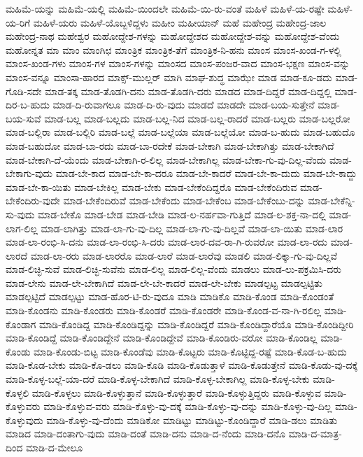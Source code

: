 ಮಹಿಮೆ-ಯನ್ನು
ಮಹಿಮೆ-ಯಲ್ಲಿ
ಮಹಿಮೆ-ಯಿಂದಲೇ
ಮಹಿಮೆ-ಯಿ-ರು-ವಂತೆ
ಮಹಿಳೆ
ಮಹಿಳೆ-ಯ-ರಷ್ಟೇ
ಮಹಿಳೆ-ಯ-ರಿಗೆ
ಮಹಿಳೆ-ಯರು
ಮಹಿಳೆ-ಯೊಬ್ಬಳಿದ್ದಳು
ಮಹೀಂ
ಮಹೀಯಾನ್
ಮಹೆ
ಮಹೇಂದ್ರ
ಮಹೇಂದ್ರ-ಜಾಲ
ಮಹೇಂದ್ರ-ನಾಥ
ಮಹೇಶ್ವರ
ಮಹೋದ್ದೇಶ-ಗಳನ್ನು
ಮಹೋದ್ದೇಶದ
ಮಹೋದ್ದೇಶ-ವನ್ನು
ಮಹೋದ್ದೇಶ-ವೆಂದು
ಮಹೋನ್ನತ
ಮಾ
ಮಾಂ
ಮಾಂಗಿಛ
ಮಾಂತ್ರಿಕ
ಮಾಂತ್ರಿಕ-ತೆಗೆ
ಮಾಂತ್ರಿಕ-ನಿ-ಹನು
ಮಾಂಸ
ಮಾಂಸ-ಖಂಡ-ಗ-ಳಲ್ಲಿ
ಮಾಂಸ-ಖಂಡ-ಗಳು
ಮಾಂಸ-ಗಳ
ಮಾಂಸ-ಗಳನ್ನು
ಮಾಂಸದ
ಮಾಂಸ-ಪಂಜರ-ವಾದ
ಮಾಂಸ-ಭಕ್ಷಣ
ಮಾಂಸ-ವನ್ನು
ಮಾಂಸ-ವನ್ನೂ
ಮಾಂಸಾ-ಹಾರದ
ಮಾಕ್ಸ್‌-ಮುಲ್ಲರ್
ಮಾಗಿ
ಮಾಘ-ಶುದ್ಧ
ಮಾಝೇ
ಮಾಡ
ಮಾಡ-ಕೂ-ಡದು
ಮಾಡ-ಗೊಡಿ-ಸದೇ
ಮಾಡ-ತಕ್ಕ
ಮಾಡ-ತೊಡಗಿ-ದನು
ಮಾಡ-ತೊಡಗಿ-ದರು
ಮಾಡದ
ಮಾಡ-ದಿದ್ದರೆ
ಮಾಡ-ದಿದ್ದಲ್ಲಿ
ಮಾಡ-ದಿರ-ಬ-ಹುದು
ಮಾಡ-ದಿ-ರುವಾಗಲೂ
ಮಾಡ-ದಿ-ರು-ವುದು
ಮಾಡದೆ
ಮಾಡದೇ
ಮಾಡ-ಬಯ-ಸುತ್ತೇನೆ
ಮಾಡ-ಬಯ-ಸುವೆ
ಮಾಡ-ಬಲ್ಲ
ಮಾಡ-ಬಲ್ಲದು
ಮಾಡ-ಬಲ್ಲ-ನಿದ
ಮಾಡ-ಬಲ್ಲ-ರಾದರೆ
ಮಾಡ-ಬಲ್ಲರು
ಮಾಡ-ಬಲ್ಲರೋ
ಮಾಡ-ಬಲ್ಲಿರಾ
ಮಾಡ-ಬಲ್ಲಿರಿ
ಮಾಡ-ಬಲ್ಲೆ
ಮಾಡ-ಬಲ್ಲೆಯಾ
ಮಾಡ-ಬಲ್ಲೆಯೋ
ಮಾಡ-ಬ-ಹುದು
ಮಾಡ-ಬಹುದೊ
ಮಾಡ-ಬಹುದೋ
ಮಾಡ-ಬಾ-ರದು
ಮಾಡ-ಬಾ-ರದೇಕೆ
ಮಾಡ-ಬೇಕಾಗಿ
ಮಾಡ-ಬೇಕಾಗಿತ್ತು
ಮಾಡ-ಬೇಕಾಗಿದೆ
ಮಾಡ-ಬೇಕಾಗಿ-ದೆ-ಯೆಂದು
ಮಾಡ-ಬೇಕಾಗಿ-ರ-ಲಿಲ್ಲ
ಮಾಡ-ಬೇಕಾಗಿಲ್ಲ
ಮಾಡ-ಬೇಕಾ-ಗು-ವು-ದಿಲ್ಲ-ವೆಂದು
ಮಾಡ-ಬೇಕಾಗು-ವುದು
ಮಾಡ-ಬೇ-ಕಾದ
ಮಾಡ-ಬೇ-ಕಾ-ದರೂ
ಮಾಡ-ಬೇ-ಕಾದರೆ
ಮಾಡ-ಬೇ-ಕಾ-ದುದು
ಮಾಡ-ಬೇ-ಕಾದ್ದು
ಮಾಡ-ಬೇ-ಕಾ-ಯಿತು
ಮಾಡ-ಬೇಕಿಲ್ಲ
ಮಾಡ-ಬೇಕು
ಮಾಡ-ಬೇಕೆಂದಿದ್ದರೊ
ಮಾಡ-ಬೇಕೆಂದಿರುವ
ಮಾಡ-ಬೇಕೆಂದಿರು-ವುದೇ
ಮಾಡ-ಬೇಕೆಂದಿರುವೆ
ಮಾಡ-ಬೇಕೆಂದು
ಮಾಡ-ಬೇಕೆಂಬ
ಮಾಡ-ಬೇಕೆಂಬು-ದನ್ನು
ಮಾಡ-ಬೇಕೆನ್ನಿ-ಸು-ವುದು
ಮಾಡ-ಬೇಕೊ
ಮಾಡ-ಬೇಡ
ಮಾಡ-ಬೇಡಿ
ಮಾಡ-ಲ-ನರ್ಹವಾ-ಗುತ್ತಿದೆ
ಮಾಡ-ಲ-ಶಕ್ತ-ನಾ-ದಲ್ಲಿ
ಮಾಡ-ಲಾಗ-ಲಿಲ್ಲ
ಮಾಡ-ಲಾಗಿತ್ತು
ಮಾಡ-ಲಾ-ಗು-ವು-ದಿಲ್ಲ
ಮಾಡ-ಲಾ-ಗು-ವು-ದಿಲ್ಲವೆ
ಮಾಡ-ಲಾ-ಯಿತು
ಮಾಡ-ಲಾರ
ಮಾಡ-ಲಾ-ರಂಭಿ-ಸಿ-ದನು
ಮಾಡ-ಲಾ-ರಂಭಿ-ಸಿ-ದರು
ಮಾಡ-ಲಾರ-ದವ-ರಾ-ಗಿ-ರುವರೋ
ಮಾಡ-ಲಾ-ರದು
ಮಾಡ-ಲಾರದೆ
ಮಾಡ-ಲಾ-ರರು
ಮಾಡ-ಲಾರರೊ
ಮಾಡ-ಲಾರೆ
ಮಾಡ-ಲಾರೆವು
ಮಾಡಲಿ
ಮಾಡ-ಲಿಕ್ಕಾ-ಗು-ವು-ದಿಲ್ಲವೆ
ಮಾಡ-ಲಿಚ್ಛಿ-ಸುವೆ
ಮಾಡ-ಲಿಚ್ಛಿ-ಸುವೆನು
ಮಾಡ-ಲಿಲ್ಲ
ಮಾಡ-ಲಿಲ್ಲ-ವೆಂದು
ಮಾಡಲು
ಮಾಡ-ಲು-ಪಕ್ರಮಿಸಿ-ದರು
ಮಾಡ-ಲೇನು
ಮಾಡ-ಲೇ-ಬೇಕಾಗಿದೆ
ಮಾಡ-ಲೇ-ಬೇ-ಕಾದರೆ
ಮಾಡ-ಲೇ-ಬೇಕು
ಮಾಡಲ್ಪಟ್ಟ
ಮಾಡಲ್ಪಟ್ಟಿತು
ಮಾಡಲ್ಪಟ್ಟಿದೆ
ಮಾಡಲ್ಪಟ್ಟು
ಮಾಡ-ಹೊರ-ಟಿ-ರು-ವುದೂ
ಮಾಡಿ
ಮಾಡಿಕೊ
ಮಾಡಿ-ಕೊಂಡ
ಮಾಡಿ-ಕೊಂಡಂತೆ
ಮಾಡಿ-ಕೊಂಡನು
ಮಾಡಿ-ಕೊಂಡರು
ಮಾಡಿ-ಕೊಂಡರೆ
ಮಾಡಿ-ಕೊಂಡರೇ
ಮಾಡಿ-ಕೊಂಡ-ವ-ನಾ-ಗಿ-ರಲಿಲ್ಲ
ಮಾಡಿ-ಕೊಂಡಾಗ
ಮಾಡಿ-ಕೊಂಡಿದ್ದ
ಮಾಡಿ-ಕೊಂಡಿದ್ದನ್ನು
ಮಾಡಿ-ಕೊಂಡಿದ್ದರೆ
ಮಾಡಿ-ಕೊಂಡಿದ್ದಾರೆಯೊ
ಮಾಡಿ-ಕೊಂಡಿದ್ದೀರಿ
ಮಾಡಿ-ಕೊಂಡಿದ್ದೆ
ಮಾಡಿ-ಕೊಂಡಿದ್ದೇನೆ
ಮಾಡಿ-ಕೊಂಡಿದ್ದೇವೆ
ಮಾಡಿ-ಕೊಂಡಿರು-ವರೋ
ಮಾಡಿ-ಕೊಂಡಿಲ್ಲ
ಮಾಡಿ-ಕೊಂಡು
ಮಾಡಿ-ಕೊಂಡು-ಬಿಟ್ಟ
ಮಾಡಿ-ಕೊಂಡೆವು
ಮಾಡಿ-ಕೊಟ್ಟರು
ಮಾಡಿ-ಕೊಟ್ಟಿದ್ದ-ರಷ್ಟೆ
ಮಾಡಿ-ಕೊಡ-ಬ-ಹುದು
ಮಾಡಿ-ಕೊಡ-ಬೇಕು
ಮಾಡಿ-ಕೊ-ಡಲು
ಮಾಡಿ-ಕೊಡಿ
ಮಾಡಿ-ಕೊಡುತ್ತಾಳೆ
ಮಾಡಿ-ಕೊಡುತ್ತೇನೆ
ಮಾಡಿ-ಕೊಡು-ವು-ದಕ್ಕೆ
ಮಾಡಿ-ಕೊಳ್ಳ-ಬಲ್ಲೆ-ಯಾ-ದರೆ
ಮಾಡಿ-ಕೊಳ್ಳ-ಬೇಕಾಗಿದೆ
ಮಾಡಿ-ಕೊಳ್ಳ-ಬೇಕಾಗಿಲ್ಲ
ಮಾಡಿ-ಕೊಳ್ಳ-ಬೇಕು
ಮಾಡಿ-ಕೊಳ್ಳಲಿ
ಮಾಡಿ-ಕೊಳ್ಳಲು
ಮಾಡಿ-ಕೊಳ್ಳುತ್ತಾನೆ
ಮಾಡಿ-ಕೊಳ್ಳುತ್ತಾರೆ
ಮಾಡಿ-ಕೊಳ್ಳುತ್ತಿದ್ದರು
ಮಾಡಿ-ಕೊಳ್ಳುವ
ಮಾಡಿ-ಕೊಳ್ಳುವರು
ಮಾಡಿ-ಕೊಳ್ಳುವ-ವರು
ಮಾಡಿ-ಕೊಳ್ಳು-ವು-ದಕ್ಕೆ
ಮಾಡಿ-ಕೊಳ್ಳು-ವು-ದನ್ನು
ಮಾಡಿ-ಕೊಳ್ಳು-ವು-ದಿಲ್ಲ
ಮಾಡಿ-ಕೊಳ್ಳುವುದು
ಮಾಡಿ-ಕೊಳ್ಳು-ವು-ದೆಂದು
ಮಾಡಿಕೋ
ಮಾಡಿಟ್ಟು
ಮಾಡಿಟ್ಟು-ಕೊಂಡಿದ್ದಾರೆ
ಮಾಡಿ-ಡಲು
ಮಾಡಿತು
ಮಾಡಿದ
ಮಾಡಿ-ದಂತಾಗು-ವುದು
ಮಾಡಿ-ದಂತೆ
ಮಾಡಿ-ದನು
ಮಾಡಿ-ದ-ನೆಂದು
ಮಾಡಿ-ದನೊ
ಮಾಡಿ-ದ-ಮಾತ್ರ-ದಿಂದ
ಮಾಡಿ-ದ-ಮೇಲೂ
